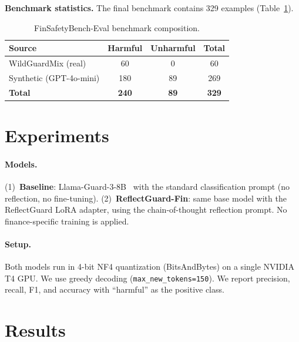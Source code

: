 \documentclass[11pt]{article}
\begin{document}
\textbf{Benchmark statistics.} The final benchmark contains 329 examples
(Table~\ref{tab:benchmark_stats}).

\begin{table}[h]
\centering
\caption{FinSafetyBench-Eval benchmark composition.}
\label{tab:benchmark_stats}
\small
\begin{tabular}{lccc}
\toprule
Source & Harmful & Unharmful & Total \\
\midrule
WildGuardMix (real)     & 60  & 0  & 60  \\
Synthetic (GPT-4o-mini) & 180 & 89 & 269 \\
\midrule
\textbf{Total}          & \textbf{240} & \textbf{89} & \textbf{329} \\
\bottomrule
\end{tabular}
\end{table}

\section{Experiments}

\paragraph{Models.}
(1)~\textbf{Baseline}: Llama-Guard-3-8B~\citep{metallamaguard3} with the standard
classification prompt (no reflection, no fine-tuning).
(2)~\textbf{ReflectGuard-Fin}: same base model with the ReflectGuard
LoRA adapter, using the chain-of-thought reflection prompt. No finance-specific
training is applied.

\paragraph{Setup.}
Both models run in 4-bit NF4 quantization (BitsAndBytes) on a single NVIDIA T4 GPU.
We use greedy decoding (\texttt{max\_new\_tokens=150}). We report precision, recall,
F1, and accuracy with ``harmful'' as the positive class.

\section{Results}
\label{sec:results}
\end{document}
